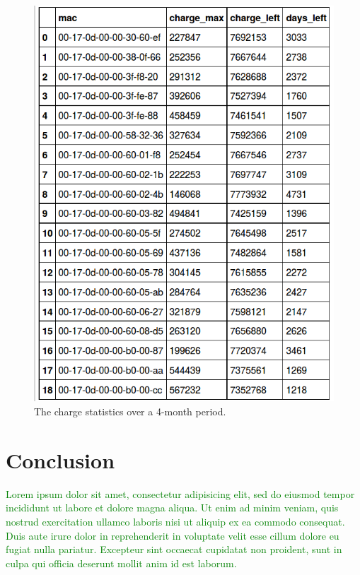 \documentclass{sig-alternate}
\newcommand{\lorem}               {\textcolor{green}{Lorem ipsum dolor sit amet, consectetur adipisicing elit, sed do eiusmod tempor incididunt ut labore et dolore magna aliqua. Ut enim ad minim veniam, quis nostrud exercitation ullamco laboris nisi ut aliquip ex ea commodo consequat. Duis aute irure dolor in reprehenderit in voluptate velit esse cillum dolore eu fugiat nulla pariatur. Excepteur sint occaecat cupidatat non proident, sunt in culpa qui officia deserunt mollit anim id est laborum.}}
\begin{document}
\begin{figure}
    \centering
    \includegraphics[width=\columnwidth]{stats_charge}
    \caption{The charge statistics over a 4-month period.}
    \label{fig:stats_charge}
\end{figure}


\section{Conclusion}
\label{sec:conclusion}


\lorem




\end{document}
